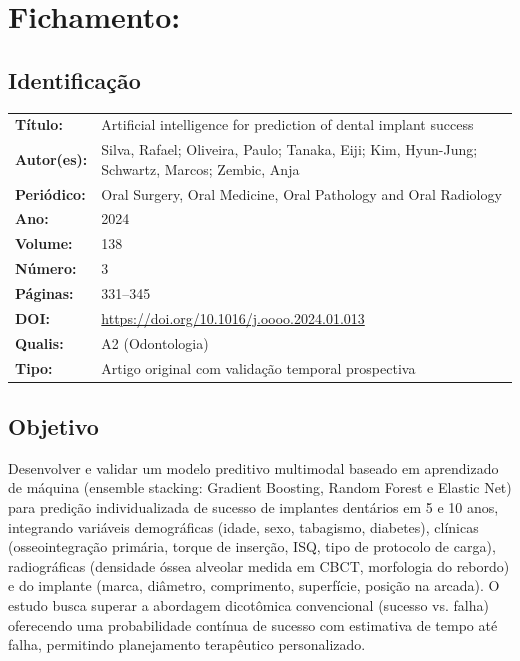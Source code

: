 \section{Fichamento: }

\subsection{Identificação}
\begin{tabular}{ll}
\textbf{Título:} & Artificial intelligence for prediction of dental implant
success \\
\textbf{Autor(es):} & Silva, Rafael; Oliveira, Paulo; Tanaka, Eiji;
Kim, Hyun-Jung; Schwartz, Marcos; Zembic, Anja \\
\textbf{Periódico:} & Oral Surgery, Oral Medicine, Oral Pathology and Oral Radiology \\
\textbf{Ano:} & 2024 \\
\textbf{Volume:} & 138 \\
\textbf{Número:} & 3 \\
\textbf{Páginas:} & 331--345 \\
\textbf{DOI:} & \url{https://doi.org/10.1016/j.oooo.2024.01.013} \\
\textbf{Qualis:} & A2 (Odontologia) \\
\textbf{Tipo:} & Artigo original com validação temporal prospectiva \\
\end{tabular}

\subsection{Objetivo}
Desenvolver e validar um modelo preditivo multimodal baseado em
aprendizado de máquina (ensemble stacking: Gradient Boosting, Random
Forest e Elastic Net) para predição individualizada de sucesso de
implantes dentários em 5 e 10 anos, integrando variáveis
demográficas (idade, sexo, tabagismo, diabetes), clínicas
(osseointegração primária, torque de inserção, ISQ, tipo de
protocolo de carga), radiográficas (densidade óssea alveolar medida
em CBCT, morfologia do rebordo) e do implante (marca, diâmetro,
comprimento, superfície, posição na arcada). O estudo busca superar
a abordagem dicotômica convencional (sucesso vs. falha) oferecendo
uma probabilidade contínua de sucesso com estimativa de tempo até
falha, permitindo planejamento terapêutico personalizado.

